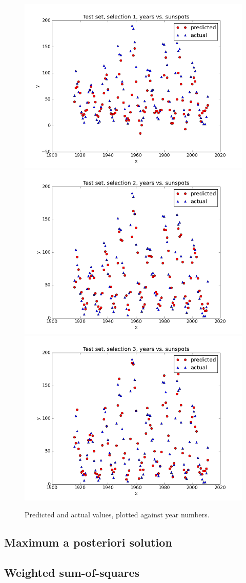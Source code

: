 \documentclass[a4paper]{article}
\begin{document}
\begin{figure}[H]
  \begin{adjustwidth}{-7em}{-7em}
    \centering
    \includegraphics[width=.3\linewidth]{figures/years_vs_sunspots_selection1.png}
    \includegraphics[width=.3\linewidth]{figures/years_vs_sunspots_selection2.png}
    \includegraphics[width=.3\linewidth]{figures/years_vs_sunspots_selection3.png}
  \end{adjustwidth}
  \caption{Predicted and actual values, plotted against year numbers.}
  \label{fig:years_vs_sunspots}
\end{figure}

\subsection{Maximum a posteriori solution}

\subsection{Weighted sum-of-squares}
\end{document}
